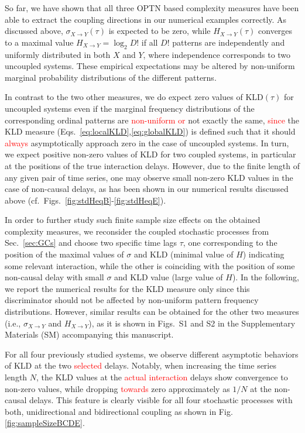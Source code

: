 \documentclass[12pt,aip,cha,reprint,nofootinbib]{revtex4-1}
\begin{document}
{\color{red}So far, we have shown that all three OPTN based complexity measures have been able to extract the coupling directions in our numerical examples correctly. As discussed above, $\sigma_{X\to Y}(\tau)$ is expected to be zero, while $H_{X\to Y}(\tau)$ converges to a maximal value $H_{X \to Y} = \log_2 D!$ if all $D!$ patterns are independently and uniformly distributed in both $X$ and $Y$, where independence corresponds to two uncoupled systems. These empirical expectations may be altered by non-uniform marginal probability distributions of the different patterns.}

{\color{red}In contrast to the two other measures, we do expect zero values of $\text{KLD}(\tau)$ for uncoupled systems even }if the marginal frequency distributions of the corresponding ordinal patterns are \textcolor{red}{non-uniform or} not exactly the same, \textcolor{red}{since} the KLD measure (Eqs.~\ref{eq:localKLD},\ref{eq:globalKLD}) is defined such that it should \textcolor{red}{always} asymptotically approach zero in the case of uncoupled systems. In turn, we expect positive non-zero values of KLD for two coupled systems, in particular at the positions of the true interaction delays. However, due to the finite length of any given pair of time series, one may observe small non-zero KLD values in the case of non-causal delays, as has been shown in our numerical results discussed above (cf.\ Figs.~\ref{fig:stdHeqB}-\ref{fig:stdHeqE}). 

{\color{red}In order to further study such finite sample size effects on the obtained complexity measures, we reconsider the coupled stochastic processes from Sec.~\ref{sec:GCs} and choose two specific time lags $\tau$, one corresponding to the position of the maximal values of $\sigma$ and KLD (minimal value of $H$) indicating some relevant interaction, while the other is coinciding with the position of some non-causal delay with small $\sigma$ and KLD value (large value of $H$). In the following, we report the numerical results for the KLD measure only since this discriminator should not be affected by non-uniform pattern frequency distributions. However, similar results can be obtained for the other two measures (i.e., $\sigma_{X\to Y}$ and $H_{X\to Y}$), as it is shown in Figs.~S1 and S2 in the Supplementary Materials (SM) accompanying this manuscript.}

For all four previously studied systems, we observe different asymptotic behaviors of KLD at the two \textcolor{red}{selected} delays. Notably, when increasing the time series length $N$, the KLD values at the \textcolor{red}{actual interaction} delays show convergence to non-zero values, while dropping \textcolor{red}{towards} zero approximately as $1/N$ at the non-causal delays. This feature is clearly visible for all four stochastic processes with both, unidirectional and bidirectional coupling as shown in Fig. \ref{fig:sampleSizeBCDE}. 
\end{document}
